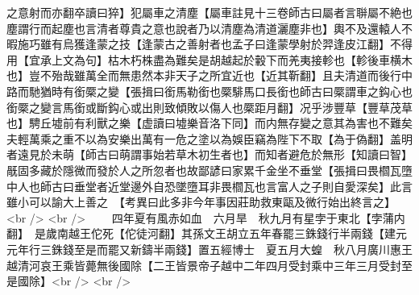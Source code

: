之意射而亦翻卒讀曰猝】犯屬車之清塵【屬車註見十三卷師古曰屬者言聨屬不絶也塵謂行而起塵也言清者尊貴之意也說者乃以清塵為清道灑塵非也】輿不及還轅人不暇施巧雖有烏獲逢蒙之技【逢蒙古之善射者也孟子曰逢蒙學射於羿逢皮江翻】不得用【宜承上文為句】枯木朽株盡為難矣是胡越起於轂下而羌夷接軫也【軫後車横木也】豈不殆哉雖萬全而無患然本非天子之所宜近也【近其靳翻】且夫清道而後行中路而馳猶時有銜橜之變【張揖曰銜馬勒銜也橜騑馬口長銜也師古曰橜謂車之鈎心也銜橜之變言馬銜或斷鈎心或出則致傾敗以傷人也橜距月翻】况乎涉豐草【豐草茂草也】騁丘墟前有利獸之樂【虚讀曰墟樂音洛下同】而内無存變之意其為害也不難矣夫輕萬乘之重不以為安樂出萬有一危之塗以為娛臣竊為陛下不取【為于偽翻】盖明者遠見於未萌【師古曰萌謂事始若草木初生者也】而知者避危於無形【知讀曰智】旤固多藏於隱微而發於人之所忽者也故鄙諺曰家累千金坐不垂堂【張揖曰畏櫩瓦墮中人也師古曰垂堂者近堂邊外自恐墜墮耳非畏櫩瓦也言富人之子則自愛深矣】此言雖小可以諭大上善之　【考異曰此多非今年事因莊助救東甌及微行始出終言之】<br />
<br />
　　四年夏有風赤如血　六月旱　秋九月有星孛于東北【孛蒲内翻】　是歲南越王佗死【佗徒河翻】其孫文王胡立五年春罷三銖錢行半兩錢【建元元年行三銖錢至是而罷又新鑄半兩錢】置五經博士　夏五月大蝗　秋八月廣川惠王越清河哀王乘皆薨無後國除【二王皆景帝子越中二年四月受封乘中三年三月受封至是國除】<br />
<br />
